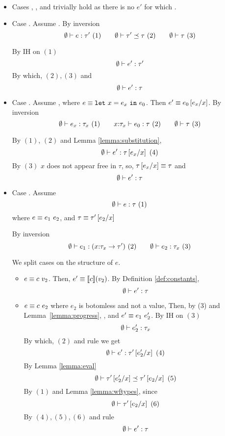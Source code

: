 \begin{itemize}
\item Cases \rtvar, \rtconst, \rtfun and \rtbot trivially hold
       as there is no $e'$ for which . 

\item Case \rtsub. Assume .
By inversion
$$	\hastype{\emptyset}{e}{\tau'} \ (1) \qquad
	\issubtype{\emptyset}{\tau'}{\tau}\ (2) \qquad
	\iswellformed{\emptyset}{\tau}\ (3)
$$

By IH on $(1)$
$$	\hastype{\emptyset}{e'}{\tau'} $$
By which, $(2), (3)$ and \rtsub
$$	\hastype{\emptyset}{e'}{\tau}$$

\item Case \rtlet. Assume , 
where $e \equiv \elet{x}{e_x}{e_0}$. Then 
 $e' \equiv e_0\sub{x}{e_x}$.
By inversion
$$
	\hastype{\emptyset}{e_x}{\tau_{x}} \ (1) \qquad
	\hastype{x\colon\tau_x}{e_0}{\tau} \ (2) \qquad
	\iswellformed{\emptyset}{\tau} \ (3)
$$

By $(1)$, $(2)$ and Lemma \ref{lemma:substitution}, 
$$\hastype{\emptyset}{e'}{\tau\sub{x}{e_x}} \ (4)$$
By $(3)$ $x$ does not appear free in $\tau$, so, $\tau\sub{x}{e_x} \equiv \tau$ and
$$\hastype{\emptyset}{e'}{\tau}$$

\item Case \rtapp. Assume
$$	\hastype{\emptyset}{e}{\tau}\ (1)$$
where $e \equiv \eapp{e_1}{e_2}$, and
	  $\tau\equiv\tau'\sub{x}{e_2}$

By inversion
$$	
	\hastype{\emptyset}{e_1}{(\tfun{x}{\tau_{x}}{\tau'})}\ (2) \qquad
	\hastype{\emptyset}{e_2}{\tau_{x}}\ (3)
$$

We split cases on the structure of $e$.
\begin{itemize}
\item $e\equiv \eapp{c}{v_2}$.
Then, $e'\equiv\interp{c}(v_2)$.
By Definition \ref{def:constants},
$$\hastype{\emptyset}{e'}{\tau}$$

\item $e\equiv \eapp{c}{e_2}$ where $e_2$ is botomless and not a value, 
Then, by (3) and Lemma~\ref{lemma:progress},
, and $e' \equiv \eapp{e_1}{e_2'}$.
%
By IH on $(3)$
$$	\hastype{\emptyset}{e_2'}{\tau_{x}}$$
By which, $(2)$ and rule \rtapp we get
$$\hastype{\emptyset}{e'}{\tau'\sub{x}{e_2'}}\ (4)$$
By Lemma \ref{lemma:eval}
$$
	\issubtype{\emptyset}{\tau'\sub{x}{e_2'}}{\tau'\sub{x}{e_2}}\ (5)
$$
By $(1)$ and Lemma \ref{lemma:wftypes}, since \iswellformed{}{\emptyset}
$$
	\iswellformed{\emptyset}{\tau'\sub{x}{e_2}}\ (6)
$$
By $(4), (5), (6)$ and rule \rtsub
$$	\hastype{\emptyset}{e'}{\tau}$$


\end{itemize}
\end{itemize}
